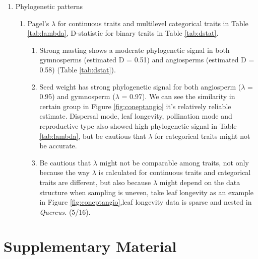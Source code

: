 \documentclass{article}
\begin{document}
\begin{enumerate}
\item Phylogenetic patterns
\begin{enumerate}
\item Pagel's $\lambda$ for continuous traits and multilevel categorical traits in Table \ref{tab:lambda}, D-statistic for binary traits in Table \ref{tab:dstat}.
\begin{enumerate}
\item Strong masting shows a moderate phylogenetic signal in both gymnosperms (estimated D = 0.51) and angiosperms (estimated D = 0.58) (Table \ref{tab:dstat}).
\item Seed weight has strong phylogenetic signal for both angiosperm ($\lambda$ = 0.95) and gymnosperm ($\lambda$ = 0.97). We can see the similarity in certain group in Figure \ref{fig:coneptangio} it's relatively reliable estimate. Dispersal mode, leaf longevity, pollination mode and reproductive type also showed high phylogenetic signal in Table \ref{tab:lambda}, but be cautious that $\lambda$ for categorical traits might not be accurate. 
\item Be cautious that $\lambda$ might not be comparable among traits, not only because the way $\lambda$ is calculated for continuous traits and categorical traits are different, but also because $\lambda$ might depend on the data structure when sampling is uneven, take leaf longevity as an example in Figure \ref{fig:coneptangio},leaf longevity data is sparse and nested in \textit{Quercus.} (5/16). 
\end{enumerate}

\end{enumerate}

\end{enumerate}

\clearpage
\appendix
\section{Supplementary Material}
\setcounter{table}{0}
\renewcommand{\thetable}{S\arabic{table}}

\setcounter{figure}{0}
\renewcommand{\thefigure}{S\arabic{figure}}
\end{document}
